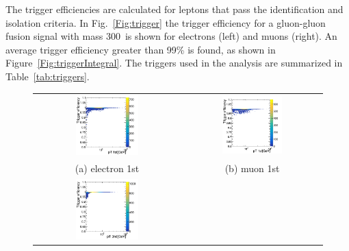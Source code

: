 \newline
The trigger efficiencies are calculated for leptons that pass the identification and isolation criteria.
In Fig.~\ref{Fig:trigger} the trigger efficiency for a gluon-gluon fusion signal with mass 300~\GeV is shown for electrons (left) and muons (right).
An average trigger efficiency greater than 99\% is found, as shown in Figure~\ref{Fig:triggerIntegral}. The triggers used in the analysis are summarized in Table~\ref{tab:triggers}. 
\begin{figure}[htbp]
\centering
\begin{tabular}{cc}
 \includegraphics[width=0.45\textwidth]{../AN/Figs/Trigger/ele1.png} &
 \includegraphics[width=0.45\textwidth]{../AN/Figs/Trigger/mu1.png} \\
 (a) electron 1st & (b) muon 1st \\
 \includegraphics[width=0.45\textwidth]{../AN/Figs/Trigger/ele2.png} &

\end{tabular}
\end{figure}

